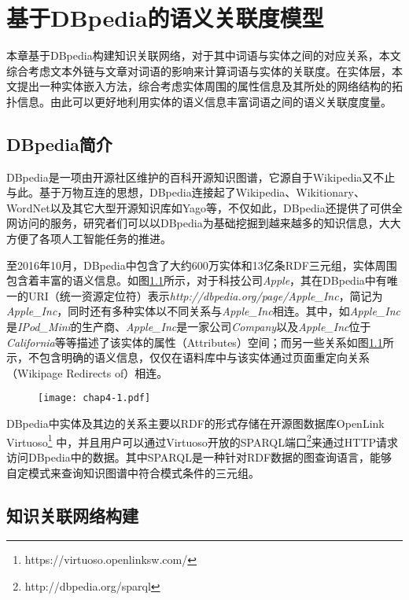 \chapter{基于DBpedia的语义关联度模型}
\label{chap:chap04}

本章基于DBpedia构建知识关联网络，对于其中词语与实体之间的对应关系，本文综合考虑文本外链与文章对词语的影响来计算词语与实体的关联度。在实体层，本文提出一种实体嵌入方法，综合考虑实体周围的属性信息及其所处的网络结构的拓扑信息。由此可以更好地利用实体的语义信息丰富词语之间的语义关联度度量。

\section{DBpedia简介}

DBpedia是一项由开源社区维护的百科开源知识图谱，它源自于Wikipedia又不止与此。基于万物互连的思想，DBpedia连接起了Wikipedia、Wikitionary、WordNet以及其它大型开源知识库如Yago等，不仅如此，DBpedia还提供了可供全网访问的服务，研究者们可以以DBpedia为基础挖掘到越来越多的知识信息，大大方便了各项人工智能任务的推进。

至2016年10月，DBpedia中包含了大约600万实体和13亿条RDF三元组，实体周围包含着丰富的语义信息。如图\ref{chap4-1}所示，对于科技公司\emph{Apple}，其在DBpedia中有唯一的URI（统一资源定位符）表示\emph{http://dbpedia.org/page/Apple\_Inc}，简记为\emph{Apple\_Inc}，同时还有多种实体以不同关系与\emph{Apple\_Inc}相连。其中，如\emph{Apple\_Inc}是\emph{IPod\_Mini}的生产商、\emph{Apple\_Inc}是一家公司\emph{Company}以及\emph{Apple\_Inc}位于\emph{California}等等描述了该实体的属性（Attributes）空间；而另一些关系如图\ref{chap4-1}所示，不包含明确的语义信息，仅仅在语料库中与该实体通过页面重定向关系（Wikipage Redirects of）相连。

\begin{figure}[!ht]
    \centerline{\texttt{[image: chap4-1.pdf]}}
    \label{chap4-1}
\end{figure}

DBpedia中实体及其边的关系主要以RDF的形式存储在开源图数据库OpenLink Virtuoso\footnote{https://virtuoso.openlinksw.com/} 中，并且用户可以通过Virtuoso开放的SPARQL端口\footnote{http://dbpedia.org/sparql}来通过HTTP请求访问DBpedia中的数据。其中SPARQL是一种针对RDF数据的图查询语言，能够自定模式来查询知识图谱中符合模式条件的三元组。


\section{知识关联网络构建}

